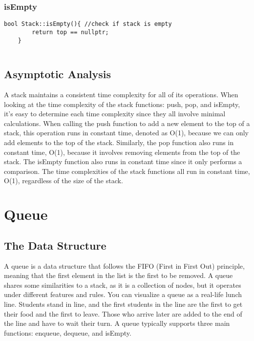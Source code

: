 \documentclass[letterpaper, 10pt,DIV=13]{scrartcl}
\numberwithin{equation}{section} %
\numberwithin{figure}{section} %
\numberwithin{table}{section} %
\begin{document}
\subsubsection*{isEmpty}
    \lstset{numbers=left, numberstyle=\tiny, stepnumber=1, numbersep=5pt, basicstyle=\footnotesize\ttfamily}
    \begin{lstlisting}[frame=single, ]
    bool Stack::isEmpty(){ //check if stack is empty
        return top == nullptr;
    }
    
\end{lstlisting}


\subsection{Asymptotic Analysis}
A stack maintains a consistent time complexity for all of its operations. When looking at the time complexity of the stack functions: push, pop, and isEmpty, it's easy to determine each time complexity since they all involve minimal calculations. When calling the push function to add a new element to the top of a stack, this operation runs in constant time, denoted as O(1), because we can only add elements to the top of the stack. Similarly, the pop function also runs in constant time, O(1), because it involves removing elements from the top of the stack. The isEmpty function also runs in constant time since it only performs a comparison. The time complexities of the stack functions all run in constant time, O(1), regardless of the size of the stack.



\pagebreak

\section{Queue}

\subsection{The Data Structure}
A queue is a data structure that follows the FIFO (First in First Out) principle, meaning that the first element in the list is the first to be removed. A queue shares some similarities to a stack, as it is a collection of nodes, but it operates under different features and rules. You can visualize a queue as a real-life lunch line. Students stand in line, and the first students in the line are the first to get their food and the first to leave. Those who arrive later are added to the end of the line and have to wait their turn. A queue typically supports three main functions: enqueue, dequeue, and isEmpty.
\end{document}
